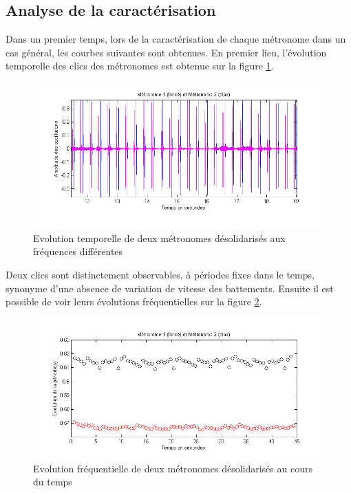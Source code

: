 \documentclass[a4paper,11pt]{report}
\begin{document}
\subsection{Analyse de la caractérisation}
Dans un premier temps, lors de la caractérisation de chaque métronome dans un cas général, les courbes suivantes sont obtenues. En premier lieu, l'évolution temporelle des clics des métronomes est obtenue sur la figure \ref{CaractérisationT}.
\begin{figure}[h]
\centering
\includegraphics[width=1\textwidth]{Caracterisation_temporelle_200BPM}
\caption{Evolution temporelle de deux métronomes désolidarisés aux fréquences différentes}\label{CaractérisationT}
\end{figure}

Deux clics sont distinctement observables, à périodes fixes dans le temps, synonyme d'une absence de variation de vitesse des battements. Ensuite il est possible de voir leurs évolutions fréquentielles sur la figure \ref{CaractérisationF}.
\begin{figure}[h]
\centering
\includegraphics[width=1\textwidth]{Caracterisation_Frequence_200BPM}
\caption{Evolution fréquentielle de deux métronomes désolidarisés au cours du temps}\label{CaractérisationF}
\end{figure}
\end{document}
